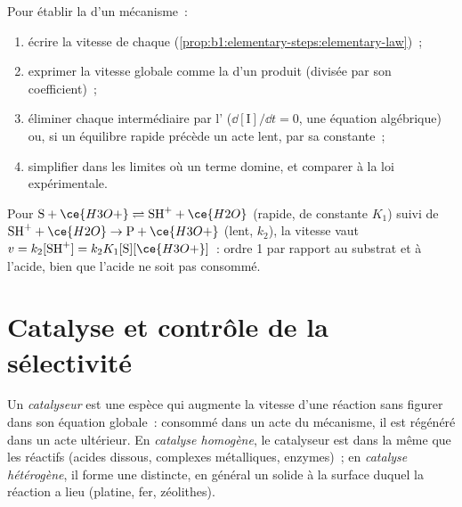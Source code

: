 \begin{method}\label{met:b1:elementary-steps:rate-law}
Pour établir la  d'un mécanisme~:
\begin{enumerate}
  \item écrire la vitesse de chaque  (\cref{prop:b1:elementary-steps:elementary-law})~;
  \item exprimer la vitesse globale comme la  d'un
        produit (divisée par son coefficient)~;
  \item éliminer chaque intermédiaire par l' ($\dd[\mathrm{I}]/\dd t = 0$, une équation
        algébrique) ou, si un équilibre rapide précède un acte lent, par
        sa constante~;
  \item simplifier dans les limites où un terme domine, et comparer à la
        loi expérimentale.
\end{enumerate}
\end{method}

\begin{example}\label{ex:b1:elementary-steps:acid}
Pour $\mathrm{S} + \ce{H3O+} \rightleftharpoons \mathrm{SH}^+ + \ce{H2O}$
(rapide, de constante $K_1$) suivi de
$\mathrm{SH}^+ + \ce{H2O} \to \mathrm{P} + \ce{H3O+}$ (lent,
$k_2$), la vitesse vaut $v = k_2[\mathrm{SH}^+] = k_2K_1[\mathrm{S}][\ce{H3O+}]$~:
ordre 1 par rapport au substrat et à l'acide, bien que l'acide ne soit
pas consommé.
\end{example}

\section{Catalyse et contrôle de la sélectivité}

\begin{definition}\label{def:b1:elementary-steps:catalyst}
Un \emph{catalyseur} est une espèce qui augmente la
vitesse d'une réaction sans figurer dans son équation globale~: consommé
dans un acte du mécanisme, il est régénéré dans un acte ultérieur. En
\emph{catalyse homogène}, le catalyseur est dans la même 
que les réactifs (acides dissous, complexes métalliques, enzymes)~; en
\emph{catalyse hétérogène}, il forme une  distincte, en
général un solide à la surface duquel la réaction a lieu (platine, fer,
zéolithes).
\end{definition}

